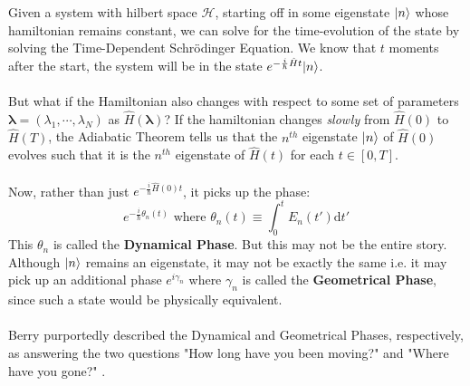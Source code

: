 \documentclass[11pt]{article}
\begin{document}
Given a system with hilbert space $\mathcal{H}$, starting off in some eigenstate $\lvert n\rangle$ whose hamiltonian remains constant, we can solve for the time-evolution of the state by solving the Time-Dependent Schr\"{o}dinger Equation. We know that $t$ moments after the start, the system will be in the state $e^{-\frac{i}{\hbar}\hat{H} t}\lvert n\rangle$.
\\
\\
But what if the Hamiltonian also changes with respect to some set of parameters $\mathbf{\lambda} = (\lambda_1, \cdots, \lambda_N)$ as $\hat{H}(\mathbf{\lambda})$? If the hamiltonian changes \emph{slowly} from $\hat{H}(0)$ to $\hat{H}(T)$, the Adiabatic Theorem tells us that the $n^{th}$ eigenstate $\lvert n\rangle$ of $\hat{H}(0)$ evolves such that it is the $n^{th}$ eigenstate of $\hat{H}(t)$ for each $t \in [0, T]$.
\\
\\
Now, rather than just $e^{-\frac{i}{\hbar}\hat{H}(0)t}$, it picks up the phase: $$ e^{-\frac{i}{\hbar}\theta_n(t) } \text{ where } \theta_n(t) \equiv \int_{0}^{t} E_n(t') \mathrm{d}t'$$ This $\theta_n$ is called the \textbf{Dynamical Phase}. But this may not be the entire story. Although $\lvert n\rangle$ remains an eigenstate, it may not be exactly the same i.e. it may pick up an additional phase $e^{i\gamma_n}$ where $\gamma_n$ is called the \textbf{Geometrical Phase}, since such a state would be physically equivalent.
\\
\\
Berry purportedly described the Dynamical and Geometrical Phases, respectively, as answering the two questions "How long have you been moving?" and "Where have you gone?" \cite{GriffithsQM}.
\end{document}
